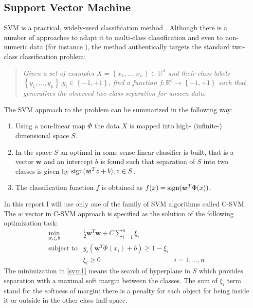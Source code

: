 \subsection{Support Vector Machine}

SVM is a practical, widely-used classification method \cite{cortes1995support}. Although there is a number of approaches to adapt it to multi-class classification and even to non-numeric data (for instance \cite{lodhi2002text}), the method authentically targets the standard two-class classification problem:

\begin{quotation}
\textit{Given a set of examples $X=\left\{ x_1, \ldots, x_n\right\} \subset \mathbb{R}^{d}$ and their class labels~$\left\{y_1,\ldots,y_n\right\}$,$y_i \in \left\{-1, +1\right\}$, find a function $f: \mathbb{R^d}\rightarrow \left\{-1, +1\right\}$ such that generalizes the observed two-class separation for unseen data.}
\end{quotation} 
The SVM approach to the problem can be summarized in the following way:
\begin{enumerate}
\item
Using a non-linear map $\Phi$ the data $X$ is mapped into high- (infinite-) dimensional space $S$.
\item
In the space $S$ an optimal in some sense linear classifier is built, that is a vector $\bm{w}$ and an intercept $b$ is found such that separation of $S$ into two classes is given by $\operatorname{sign}(\bm{w}^T z + b), z \in S$.
\item
The classification function $f$ is obtained as $f(x) = \operatorname{sign}(\bm{w}^T \Phi(x))$.
\end{enumerate}
In this report I will use only one of the family of SVM algorithms called C-SVM. The $w$ vector in C-SVM approach is specified as the solution of the following optimization task:
\begin{equation}
\begin{array}{ccc}
\underset{w,\xi,b}{\min} &
\frac{1}{2}\bm{w}^T \bm{w} + C\sum\limits_{i=1}^n \xi_i \\
\textrm{subject to} & y_i(\bm{w}^T \Phi(x_i) + b) \geq 1 - \xi_i \\
& \xi_i \geq 0 & i=1,\ldots,n
\end{array}
\label{svm1}
\end{equation}
The minimization in \ref{svm1} means the search of hyperplane in $S$ which provides separation with a maximal soft margin between the classes. The sum of $\xi_i$ term stand for the softness of margin: there is a penalty for each object for being inside it or outside in the other class half-space.

